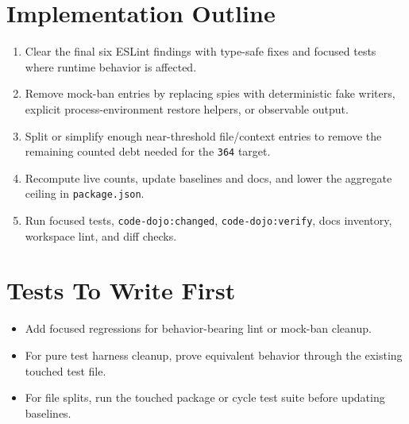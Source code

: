 \section{Implementation Outline}\label{record-242-implementation-outline}

\begin{enumerate}
\def\labelenumi{\arabic{enumi}.}
\tightlist
\item
  Clear the final six ESLint findings with type-safe fixes and focused tests where runtime behavior is affected.
\item
  Remove mock-ban entries by replacing spies with deterministic fake writers, explicit process-environment restore helpers, or observable output.
\item
  Split or simplify enough near-threshold file/context entries to remove the remaining counted debt needed for the \texttt{3\allowbreak{}6\allowbreak{}4} target.
\item
  Recompute live counts, update baselines and docs, and lower the aggregate ceiling in \texttt{p\allowbreak{}a\allowbreak{}c\allowbreak{}k\allowbreak{}a\allowbreak{}g\allowbreak{}e\allowbreak{}.\allowbreak{}j\allowbreak{}s\allowbreak{}o\allowbreak{}n}.
\item
  Run focused tests, \texttt{c\allowbreak{}o\allowbreak{}d\allowbreak{}e\allowbreak{}-\allowbreak{}d\allowbreak{}o\allowbreak{}j\allowbreak{}o\allowbreak{}:\allowbreak{}c\allowbreak{}h\allowbreak{}a\allowbreak{}n\allowbreak{}g\allowbreak{}e\allowbreak{}d}, \texttt{c\allowbreak{}o\allowbreak{}d\allowbreak{}e\allowbreak{}-\allowbreak{}d\allowbreak{}o\allowbreak{}j\allowbreak{}o\allowbreak{}:\allowbreak{}v\allowbreak{}e\allowbreak{}r\allowbreak{}i\allowbreak{}f\allowbreak{}y}, docs inventory, workspace lint, and diff checks.
\end{enumerate}

\section{Tests To Write First}\label{record-242-tests-to-write-first}

\begin{itemize}
\tightlist
\item
  Add focused regressions for behavior-bearing lint or mock-ban cleanup.
\item
  For pure test harness cleanup, prove equivalent behavior through the existing touched test file.
\item
  For file splits, run the touched package or cycle test suite before updating baselines.
\end{itemize}

